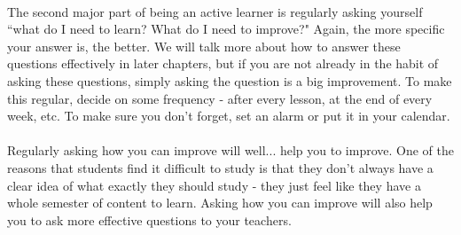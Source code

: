 	\paragraph{}
	The second major part of being an active learner is regularly asking yourself
	``what do I need to learn? What do I need to improve?" Again, the more specific
	your answer is, the better. We will talk more about how to answer these questions 
	effectively in later chapters, but if you are not already in the habit of asking
	these questions, simply asking the question is a big improvement. To make this 
	regular, decide on some frequency - after every lesson, at the end of every week,
	etc. To make sure you don't forget, set an alarm or put it in your calendar. 
	
	\paragraph{}
	Regularly asking how you can improve will well... help you to improve. One of the
	reasons that students find it difficult to study is that they don't always have
	a clear idea of what exactly they should study - they just feel like they have a 
	whole semester of content to learn. Asking how you can improve will also help you
	to ask more effective questions to your teachers. 
	

	
	
	
	